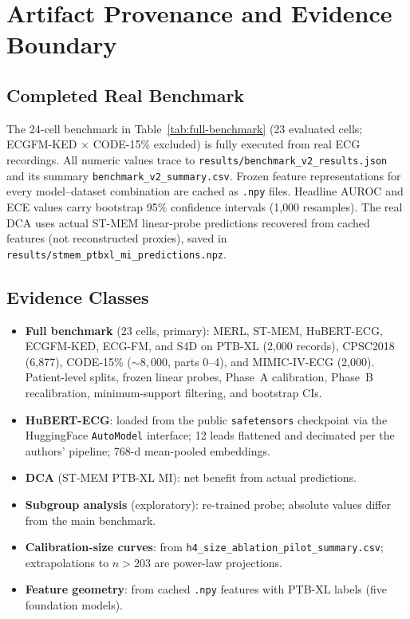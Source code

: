 \section{Artifact Provenance and Evidence Boundary}
\label{sec:appendix}
\sloppy

\subsection{Completed Real Benchmark}

The 24-cell benchmark in Table~\ref{tab:full-benchmark} (23 evaluated cells; ECGFM-KED
$\times$ CODE-15\% excluded) is fully executed from real ECG recordings. All numeric values
trace to \texttt{results/benchmark\_v2\_results.json} and its summary
\texttt{benchmark\_v2\_summary.csv}. Frozen feature representations for every model--dataset
combination are cached as \texttt{.npy} files. Headline AUROC and ECE values carry bootstrap
95\% confidence intervals (1{,}000 resamples). The real DCA uses actual ST-MEM linear-probe
predictions recovered from cached features (not reconstructed proxies), saved in
\texttt{results/stmem\_ptbxl\_mi\_predictions.npz}.

\subsection{Evidence Classes}

\begin{itemize}
  \item \textbf{Full benchmark} (23 cells, primary): MERL, ST-MEM, HuBERT-ECG, ECGFM-KED,
    ECG-FM, and S4D on PTB-XL (2{,}000 records), CPSC2018 (6{,}877), CODE-15\%
    (${\sim}8{,}000$, parts 0--4), and MIMIC-IV-ECG (2{,}000). Patient-level splits, frozen
    linear probes, Phase~A calibration, Phase~B recalibration, minimum-support filtering,
    and bootstrap CIs.
  \item \textbf{HuBERT-ECG}: loaded from the public \texttt{safetensors} checkpoint via the
    HuggingFace \texttt{AutoModel} interface; 12 leads flattened and decimated per the
    authors' pipeline; 768-d mean-pooled embeddings.
  \item \textbf{DCA} (ST-MEM PTB-XL MI): net benefit from actual predictions.
  \item \textbf{Subgroup analysis} (exploratory): re-trained probe; absolute values differ
    from the main benchmark.
  \item \textbf{Calibration-size curves}: from \texttt{h4\_size\_ablation\_pilot\_summary.csv};
    extrapolations to $n\!>\!203$ are power-law projections.
  \item \textbf{Feature geometry}: from cached \texttt{.npy} features with PTB-XL labels
    (five foundation models).
\end{itemize}

